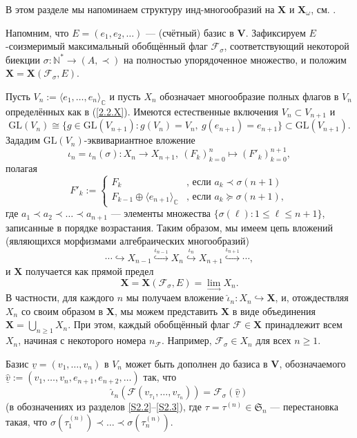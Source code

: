 \documentclass{amsart}
\theoremstyle{definition}
\newcommand{\NN}{\mathbb{N}^*}
\begin{document}
В этом разделе мы напоминаем структуру инд-многообразий  на $\mathbf{X}$ и $\mathbf{X}_\omega$, см. \cite{Dimitrov-Penkov}.

Напомним, что $E=(e_1,e_2,\ldots)$ --- (счётный) базис в $\mathbf{V}$.
Зафиксируем $E$-соизмеримый максимальный обобщённый флаг $\mathcal{F}_\sigma$, соответствующий некоторой биекции $\sigma:\NN\to(A,\prec)$ на полностью упорядоченное множество, и положим
$\mathbf{X}=\mathbf{X}(\mathcal{F}_\sigma,E)$.

Пусть $V_n:=\langle e_1,\ldots,e_n\rangle_\mathbb{C}$ и
пусть $X_n$ обозначает многообразие полных флагов в $V_n$ определённых как  в (\ref{2.2.X}).
Имеются естественные включения
$V_n\subset V_{n+1}$
и
\begin{equation}
\label{4.4-1}
\mathrm{GL}(V_n)\cong\{g\in \mathrm{GL}(V_{n+1}):g(V_n)=V_n,\ g(e_{n+1})=e_{n+1}\}\subset \mathrm{GL}(V_{n+1}).
\end{equation}
Зададим $\mathrm{GL}(V_n)$-эквивариантное вложение
\[\iota_n=\iota_n(\sigma):X_n\to X_{n+1},\ (F_k)_{k=0}^n\mapsto (F'_k)_{k=0}^{n+1},\]
полагая
\[F'_k:=\left\{
\begin{array}{ll}
F_k & \mbox{, если $a_k\prec\sigma(n+1)$} \\
F_{k-1}\oplus\langle e_{n+1}\rangle_\mathbb{C} & \mbox{, если $a_k\succeq \sigma(n+1),$}
\end{array}
\right.  \]
где $a_1\prec a_2\prec\ldots\prec a_{n+1}$ --- элементы множества $\{\sigma(\ell):1\leq \ell\leq n+1\}$, записанные в порядке возрастания.
Таким образом, мы имеем цепь вложений (являющихся морфизмами алгебраических многообразий)
\[\cdots \hookrightarrow X_{n-1} \stackrel{\iota_{n-1}}{\hookrightarrow} X_n \stackrel{\iota_{n}}{\hookrightarrow} X_{n+1} \stackrel{\iota_{n+1}}{\hookrightarrow} \cdots,\]
и $\mathbf{X}$ получается как прямой предел
\[\mathbf{X}=\mathbf{X}(\mathcal{F}_\sigma,E)=\lim_\to X_n.\]
В частности, для каждого $n$ мы получаем вложение $\hat{\iota}_n:X_n\hookrightarrow \mathbf{X}$, и, отождествляя $X_n$ со своим образом в $\mathbf{X}$, мы можем представить $\mathbf{X}$ в виде объединения
$\mathbf{X}=\bigcup_{n\geq 1}X_n$.
При этом, каждый обобщённый флаг $\mathcal{F}\in\mathbf{X}$ принадлежит всем $X_n$, начиная с некоторого номера $n_\mathcal{F}$. Например, $\mathcal{F}_\sigma\in X_n$ для всех $n\geq 1$.

Базис $\underline{v}=(v_1,\ldots,v_n)$ в $V_n$ может быть дополнен до базиса в $\mathbf{V}$, обозначаемого $\underline{\hat{v}}:=(v_1,\ldots,v_n,e_{n+1},e_{n+2},\ldots)$ так, что
\begin{equation}
\label{completed-basis}
\hat{\iota}_n(\mathcal{F}(v_{\tau_1},\ldots,v_{\tau_n}))=\mathcal{F}_\sigma(\underline{\hat{v}})
\end{equation}
(в обозначениях из разделов \ref{S2.2}--\ref{S2.3}),
где $\tau=\tau^{(n)}\in\mathfrak{S}_n$ --- перестановка такая, что
$\sigma(\tau^{(n)}_1)\prec\ldots\prec\sigma(\tau^{(n)}_n)$.
\end{document}
